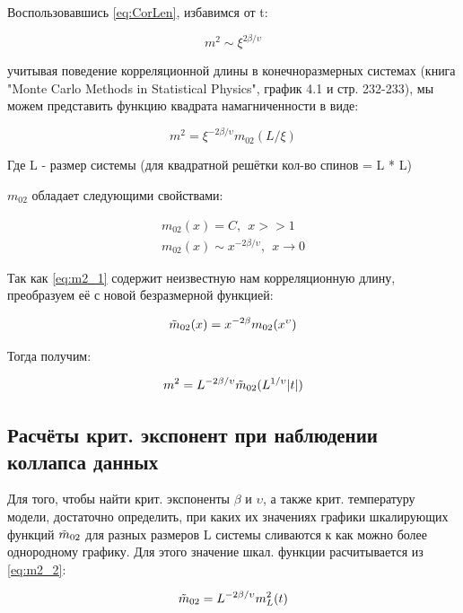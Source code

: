 Воспользовавшись \eqref{eq:CorLen}, избавимся от t:

\begin{equation}
    m^{2} \sim \xi ^{2\beta/\upsilon}
\end{equation}

учитывая поведение корреляционной длины в конечноразмерных системах (книга "Monte Carlo Methods in Statistical Physics", график 4.1 и стр. 232-233)\cite{NewBar}, мы можем представить функцию квадрата намагниченности в виде:

\begin{equation}\label{eq:m2_1}
    m^{2} = \xi ^{-2\beta/\upsilon} m_{02}(L/\xi)
\end{equation}

Где L - размер системы (для квадратной решётки кол-во спинов = L * L)

$m_{02}$ обладает следующими свойствами:

\begin{align*}
    m_{02}(x) = C,\ \ x >> 1 \\
    m_{02}(x) \sim x^{-2\beta/\upsilon},\ \ x \rightarrow 0
\end{align*}

Так как \eqref{eq:m2_1} содержит неизвестную нам корреляционную длину, преобразуем её с новой безразмерной функцией:

\begin{equation}
    \Tilde{m}_{02}(x) = x^{-2\beta} m_{02}(x^{\upsilon})
\end{equation}

Тогда получим:

\begin{equation}\label{eq:m2_2}
    m^{2} = L^{-2\beta/\upsilon} \Tilde{m}_{02}(L^{1/\upsilon}|t|)
\end{equation}

\subsection{Расчёты крит. экспонент при наблюдении коллапса данных}
Для того, чтобы найти крит. экспоненты $\beta$ и $\upsilon$, а также крит. температуру модели, достаточно определить, при каких их значениях графики шкалирующих функций $\Tilde{m}_{02}$ для разных размеров L системы сливаются к как можно более однородному графику. Для этого значение шкал. функции расчитывается из \eqref{eq:m2_2}:

\begin{equation}\label{eq:m02}
    \Tilde{m}_{02} = L^{-2\beta/\upsilon} m_{L}^{2}(t)
\end{equation}

